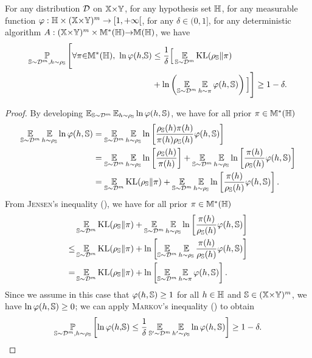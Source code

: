 \begin{noaddcontents}
\begin{lemma}
For any distribution $\D$ on $\X{\times}\Y$, for any hypothesis set $\H$, for any  measurable function $\varphi:\H\times (\X{\times}\Y)^{\m}\rightarrow [1, +\infty[$, for any $\delta\in(0,1]$, for any deterministic algorithm $A:(\X{\times}\Y)^{\m}\times\M^{*}(\H){\rightarrow} \M(\H)$, we have
\begin{align*}
    \PP_{\S\sim\D^{\m}, \h\sim \AQ}\Bigg[\forall\P{\in}\M^{*}(\H),\ \ln\varphi(\h,\!\S)&\le \frac{1}{\delta}\Big[\EE_{\S\sim\D^\m}\KL(\AQ\|\P)\\
    &+\ln\LP\EE_{\S\sim\D^\m}\EE_{\h\sim\P}\varphi(\h, \S)\RP\Big] \Bigg] \ge 1-\delta.
\end{align*}
\label{chap:dis-pra:lemma:mutual-info-kl}
\end{lemma}
\begin{proof}
By developing $\EE_{\S\sim\D^\m}\EE_{\h\sim\AQ}\ln\varphi(\h, \S)$, we have for all prior $\P\in\M^{*}(\H)$
\begin{align*}
\EE_{\S\sim\D^\m}\EE_{\h\sim\AQ}\ln\varphi(\h, \S) &= \EE_{\S\sim\D^\m}\EE_{\h\sim\AQ}\ln\LB\frac{\AQ(\h)\P(\h)}{\P(\h)\AQ(\h)}\varphi(\h, \S)\RB\\
&= \EE_{\S\sim\D^\m}\EE_{\h\sim\AQ}\ln\LB\frac{\AQ(\h)}{\P(\h)}\RB +\EE_{\S\sim\D^\m}\EE_{\h\sim\AQ}\ln\LB\frac{\P(\h)}{\AQ(\h)}\varphi(\h, \S)\RB\\
&= \EE_{\S\sim\D^\m}\KL(\AQ\|\P) +\EE_{\S\sim\D^\m}\EE_{\h\sim\AQ}\ln\LB\frac{\P(\h)}{\AQ(\h)}\varphi(\h, \S)\RB.
\end{align*}
From \textsc{Jensen}'s inequality (), we have for all prior $\P\in\M^{*}(\H)$
\begin{align}
    &\EE_{\S\sim\D^\m}\KL(\AQ\|\P) +\EE_{\S\sim\D^\m}\EE_{\h\sim\AQ}\ln\LB\frac{\P(\h)}{\AQ(\h)}\varphi(\h, \S)\RB\nonumber\\
    \le &\EE_{\S\sim\D^\m}\KL(\AQ\|\P) +\ln\LB\EE_{\S\sim\D^\m}\EE_{\h\sim\AQ}\frac{\P(\h)}{\AQ(\h)}\varphi(\h, \S)\RB\nonumber\\
    = &\EE_{\S\sim\D^\m}\KL(\AQ\|\P) +\ln\LB\EE_{\S\sim\D^\m}\EE_{\h\sim\P}\varphi(\h, \S)\RB.\label{chap:dis-pra:eq:mutual-info-1}
\end{align}
Since we assume in this case that $\varphi(\h, \S) \ge 1$ for all $h\in\H$ and $\S\in(\X{\times}\Y)^\m$, we have $\ln\varphi(\h, \S) \ge 0$; we can apply \textsc{Markov}'s inequality () to obtain
\begin{align}
    \PP_{\S\sim\D^{\m}, \h\sim \AQ}\LB \ln\varphi(\h,\!\S)\le \frac{1}{\delta}\EE_{\S'{\sim}\D^{\m}}\EE_{\h'{\sim} \AQ}\ln\varphi(\h, \S) \RB \ge 1-\delta.\label{chap:dis-pra:eq:mutual-info-2}

\end{align}
\end{proof}
\end{noaddcontents}
